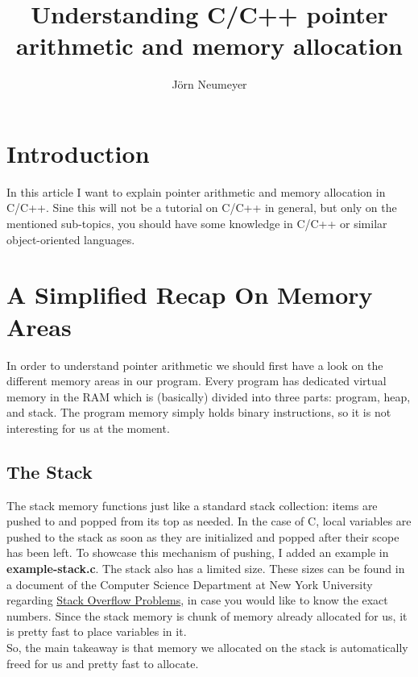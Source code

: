 \documentclass{article}
\author{J\"orn Neumeyer}
\title{Understanding C/C++ pointer arithmetic and memory allocation}
\begin{document}
  \maketitle
  \tableofcontents
  \section{Introduction}
  In this article I want to explain pointer arithmetic and memory allocation in C/C++.
  Sine this will not be a tutorial on C/C++ in general, but only on the mentioned sub-topics, you should have some knowledge in C/C++ or similar object-oriented languages.
  \section{A Simplified Recap On Memory Areas}
  In order to understand pointer arithmetic we should first have a look on the different memory areas in our program.
  Every program has dedicated virtual memory in the RAM which is (basically) divided into three parts: program, heap, and stack.
  The program memory simply holds binary instructions, so it is not interesting for us at the moment.
  \subsection{The Stack}
  The stack memory functions just like a standard stack collection: items are pushed to and popped from its top as needed.
  In the case of C, local variables are pushed to the stack as soon as they are initialized and popped after their scope has been left.
  To showcase this mechanism of pushing, I added an example in \textbf{example-stack.c}.
  The stack also has a limited size.
  These sizes can be found in a document of the Computer Science Department at New York University regarding \href{https://cs.nyu.edu/exact/core/doc/stackOverflow.txt}{Stack Overflow Problems}, in case you would like to know the exact numbers.
  Since the stack memory is chunk of memory already allocated for us, it is pretty fast to place variables in it.
  \\So, the main takeaway is that memory we allocated on the stack is automatically freed for us and pretty fast to allocate.
\end{document}
